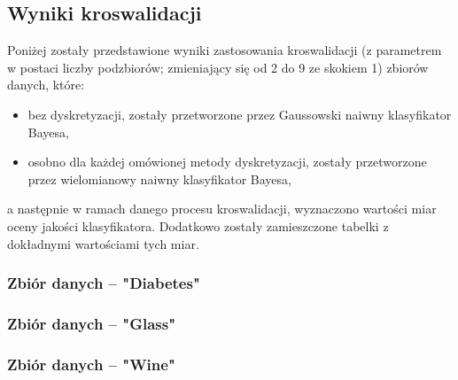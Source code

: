 \pagebreak
\subsection{Wyniki kroswalidacji}
    Poniżej zostały przedstawione wyniki zastosowania kroswalidacji (z parametrem
    w postaci liczby podzbiorów; zmieniający się od 2 do 9 ze skokiem 1) zbiorów danych,
    które:
    \begin{itemize}
        \item{bez dyskretyzacji, zostały przetworzone przez Gaussowski naiwny klasyfikator Bayesa,}
        \item{osobno dla każdej omówionej metody dyskretyzacji, zostały przetworzone przez
                wielomianowy naiwny klasyfikator Bayesa,}
    \end{itemize}
    a następnie w ramach danego procesu kroswalidacji, wyznaczono wartości miar
    oceny jakości klasyfikatora. Dodatkowo zostały zamieszczone tabelki z dokładnymi
    wartościami tych miar.

    \subsubsection{Zbiór danych -- "Diabetes"}
        
        

    \pagebreak
    \subsubsection{Zbiór danych -- "Glass"}
        
        

    \pagebreak
    \subsubsection{Zbiór danych -- "Wine"}
        
        
